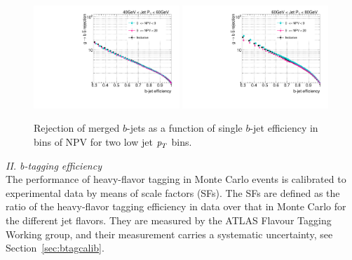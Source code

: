 \begin{figure}[tp]
\centering
\includegraphics[width=0.49\textwidth]{FIGS/systematics/LlhoodKDE_ISO_PileUp_rejvseff040.pdf}
\includegraphics[width=0.49\textwidth]{FIGS/systematics/LlhoodKDE_ISO_PileUp_rejvseff060.pdf}
\caption{Rejection of merged $b$-jets as a function of single $b$-jet efficiency in bins of NPV for two low jet ${\emph{p}_{T}}$ bins.}
\label{fig:performanceinbinsMu}
\end{figure}

\vspace{3mm}
{\em II. b-tagging efficiency} %
\\[3mm]
The performance of heavy-flavor tagging in Monte Carlo events is calibrated to experimental data by means of scale factors (SFs). %
The SFs are defined as the ratio of the heavy-flavor tagging efficiency in data over that in Monte Carlo for the different jet flavors. They are measured by the ATLAS Flavour Tagging Working group,  %
and their measurement carries a systematic uncertainty, see Section~\ref{sec:btagcalib}.  

